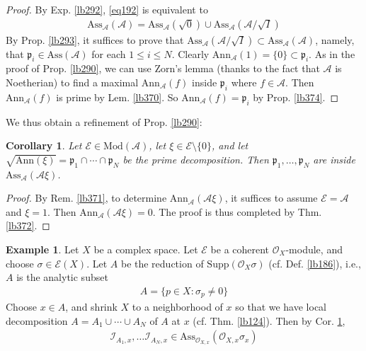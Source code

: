 \documentclass[12pt,b5paper,notitlepage]{report}
\theoremstyle{definition}
\newtheorem{eg}[df]{Example}
\theoremstyle{plain}
\newtheorem{co}[df]{Corollary}
\newcommand{\mc}{\mathcal}
\newcommand{\scr}{\mathscr}
\newcommand{\pk}{\mathfrak p}
\newcommand{\Ann}{\mathrm{Ann}}
\newcommand{\Supp}{\mathrm{Supp}}
\newcommand{\Mod}{\mathrm{Mod}}
\newcommand{\Ass}{\mathrm{Ass}}
\numberwithin{equation}{section}
\begin{document}
\begin{proof}
By Exp. \ref{lb292}, \eqref{eq192} is equivalent to
\begin{align}
\Ass_{\mc A}(\mc A)=\Ass_{\mc A}(\sqrt{0})\cup\Ass_{\mc A}(\mc A/\sqrt{I})
\end{align}
By Prop. \ref{lb293}, it suffices to prove that $\Ass_{\mc A}(\mc A/\sqrt{I})\subset\Ass_{\mc A}(\mc A)$, namely, that $\pk_i\in\Ass(\mc A)$ for each $1\leq i\leq N$. Clearly $\Ann_{\mc A}(1)=\{0\}\subset\pk_i$. As in the proof of Prop. \ref{lb290}, we can use Zorn's lemma (thanks to the fact that $\mc A$ is Noetherian) to find a maximal $\Ann_{\mc A}(f)$ inside $\pk_i$ where $f\in\mc A$. Then $\Ann_{\mc A}(f)$ is prime by Lem. \ref{lb370}. So $\Ann_{\mc A}(f)=\pk_i$ by Prop. \ref{lb374}.
\end{proof}


We thus obtain a refinement of Prop. \ref{lb290}:


\begin{co}\label{lb373}
Let $\mc E\in\Mod(\mc A)$, let $\xi\in\mc E\setminus\{0\}$, and let $\sqrt{\Ann(\xi)}=\pk_1\cap\cdots\cap\pk_N$ be the prime decomposition. Then $\pk_1,\dots,\pk_N$ are inside $\Ass_{\mc A}(\mc A\xi)$.
\end{co}


\begin{proof}
By Rem. \ref{lb371}, to determine $\Ann_{\mc A}(\mc A\xi)$, it suffices to assume $\mc E=\mc A$ and $\xi=1$. Then $\Ann_{\mc A}(\mc A\xi)=0$. The proof is thus completed by Thm. \ref{lb372}.
\end{proof}


\begin{eg}
Let $X$ be a complex space. Let $\scr E$ be a coherent $\scr O_X$-module, and choose $\sigma\in\scr E(X)$. Let $A$ be the reduction of $\Supp(\scr O_X\sigma)$ (cf. Def. \ref{lb186}), i.e., $A$ is the analytic subset
\begin{align*}
A=\{p\in X:\sigma_p\neq 0\}
\end{align*}
Choose $x\in A$, and shrink $X$ to a neighborhood of $x$ so that we have local decomposition $A=A_1\cup\cdots\cup A_N$ of $A$ at $x$ (cf. Thm. \ref{lb124}). Then by Cor. \ref{lb373},
\begin{align}
\scr I_{A_1,x},\dots\scr I_{A_N,x}\in\Ass_{\scr O_{X,x}}(\scr O_{X,x}\sigma_x)
\end{align}
\end{eg}
\end{document}
